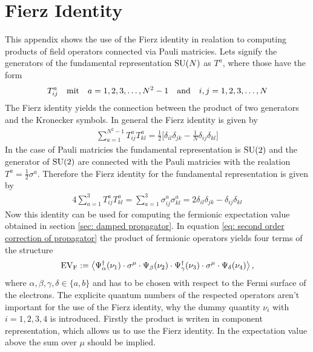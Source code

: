 %
%
\chapter{Fierz Identity}
\label{app: Fierz identity}
%
%
This appendix shows the use of the Fierz identity in realation to computing products of field operators connected via Pauli matricies.
Lets signify the generators of the fundamental representation $\mathrm{SU}(N)$ as $T^{a}$, where those have the form
%
\begin{align}
	T_{ij}^{a} \qq{mit} a = 1,2,3,\dots,N^{2}-1 \qq{and} i,j=1,2,3,\dots,N
\end{align}
%
The Fierz identity yields the connection between the product of two generators and the Kronecker symbols.
In general the Fierz identity is given by
%
\begin{align}
	\sum\limits_{a=1}^{N^{2}-1} T_{ij}^{a} T_{kl}^{a} = \frac{1}{2}\Big[\delta_{il} \delta_{jk} - \frac{1}{N} \delta_{ij} \delta_{kl}\Big]
\end{align}
%
In the case of Pauli matricies the fundamental representation is $\mathrm{SU}(2)$ and the generator of $\mathrm{SU}(2)$ are connected with the Pauli matricies with the realation $T^{a} = \frac{1}{2} \sigma^{a}$.
Therefore the Fierz identity for the fundamental representation is given by
%
\begin{align}
	4 \sum\limits_{a=1}^{3} T_{ij}^{a} T_{kl}^{a} = \sum\limits_{a=1}^{3} \sigma_{ij}^{a} \sigma_{kl}^{a} = 2 \delta_{il} \delta_{jk} - \delta_{ij} \delta_{kl}
\end{align}
%
Now this identity can be used for computing the fermionic expectation value obtained in section \ref{sec: damped propagator}.
In equation \eqref{eq: second order correction of propagator} the product of fermionic operators yields four terms of the structure
%
\begin{align}
	\mt{EV}_{\mt{F}} := \expval{\Psi_{\alpha}^{\dag}(\nu_{1}) \cdot \sigma^{\mu} \cdot \Psi_{\beta}(\nu_{2}) \cdot \Psi_{\gamma}^{\dag}(\nu_{3}) \cdot \sigma^{\mu} \cdot \Psi_{\delta}(\nu_{4})},
\end{align}
%
where $\alpha, \beta, \gamma, \delta \in \{a,b\}$ and has to be chosen with respect to the Fermi surface of the electrons.
The explicite quantum numbers of the respected operators aren't important for the use of the Fierz identity, why the dummy quantity $\nu_{i}$ with $i = 1,2,3,4$ is introduced.
Firstly the product is writen in component representation, which allows us to use the Fierz identity.
In the expectation value above the sum over $\mu$ should be implied.
